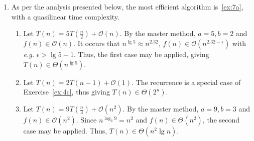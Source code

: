 \documentclass[12pt]{article}
\begin{document}
\begin{enumerate}
\begin{enumerate}
\begin{figure}[htbp]
    \end{figure}
  \end{enumerate}
  \item As per the analysis presented below, the most efficient algorithm is~\ref{ex:7a}, with a quasilinear time complexity.
  \begin{enumerate}
    \item\label{ex:7a} Let $T(n) = 5T(\frac{n}{2}) + \mathcal{O}(n)$. By the master method, $a = 5, b = 2$ and $f(n) \in \mathcal{O}(n)$. It occurs that $n^{\lg 5} \approx n^{2.32}$, $f(n) \in \mathcal{O}(n^{2.32 - \epsilon})$ with \emph{e.g.} $\epsilon > \lg 5 - 1$. Thus, the first case may be applied, giving $T(n) \in \Theta(n^{\lg 5})$.
    \item Let $T(n) = 2T(n - 1) + \mathcal{O}(1)$. The recurrence is a special case of Exercise~\ref{ex:4c}, thus giving $T(n) \in \Theta(2^{n})$.
    \item Let $T(n) = 9T(\frac{n}{3}) + \mathcal{O}(n^{2})$. By the master method, $a = 9, b = 3$ and $f(n) \in \mathcal{O}(n^{2})$. Since $n^{\log_{3} 9} = n^{2}$ and $f(n) \in \Theta(n^{2})$, the second case may be applied. Thus, $T(n) \in \Theta(n^{2} \lg n)$.
  \end{enumerate}

\end{enumerate}
\end{document}
